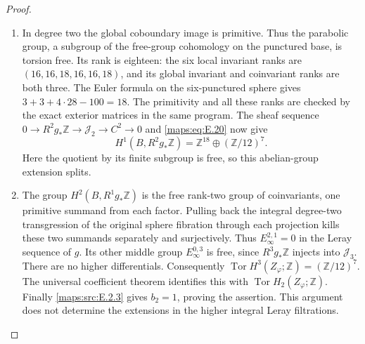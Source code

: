 \begin{proof}
\begin{enumerate}[label=\arabic*.,leftmargin=*]
\item In degree two the global coboundary image is primitive.
Thus the parabolic group, a subgroup of the free-group
cohomology on the punctured base, is torsion free. Its rank
is eighteen: the six local invariant ranks are
\((16,16,18,16,16,18)\), and its global invariant and
coinvariant ranks are both three. The Euler formula on the
six-punctured sphere gives \(3+3+4\cdot28-100=18\).
The primitivity and all these ranks are checked by the exact
exterior matrices in the same program. The sheaf sequence
\(0\to R^2g_*\mathbb Z\to\mathcal J_2\to C^2\to0\)
and \eqref{maps:eq:E.20} now give
\[
 H^1(B,R^2g_*\mathbb Z)
     =\mathbb Z^{18}\oplus(\mathbb Z/12)^7.
\]
Here the quotient by its finite subgroup is free, so this
abelian-group extension splits.

\item The group \(H^2(B,R^1g_*\mathbb Z)\) is the free
rank-two group of coinvariants, one primitive summand from
each factor. Pulling back the integral degree-two
transgression of the original sphere fibration through each
projection kills these two summands separately and
surjectively. Thus \(E_\infty^{2,1}=0\) in the Leray
sequence of \(g\). Its other middle group
\(E_\infty^{0,3}\) is free, since \(R^3g_*\mathbb Z\)
injects into \(\mathcal J_3\). There are no higher
differentials. Consequently
\(\operatorname{Tor}H^3(Z_\varphi;\mathbb Z)
=(\mathbb Z/12)^7\). The universal coefficient theorem
identifies this with \(\operatorname{Tor}H_2(Z_\varphi;\mathbb Z)\).
Finally \ref{maps:src:E.2.3} gives \(b_2=1\), proving the assertion.
This argument does not determine the extensions in the
higher integral Leray filtrations.
\end{enumerate}
\end{proof}


